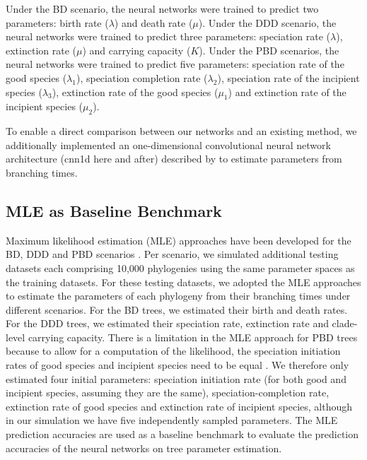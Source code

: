 {Under the BD scenario, the neural networks were trained to predict two parameters: birth rate ($\lambda$) and death rate ($\mu$). Under the DDD scenario, the neural networks were trained to predict three parameters: speciation rate ($\lambda$), extinction rate ($\mu$) and carrying capacity ($K$). Under the PBD scenarios, the neural networks were trained to predict five parameters: speciation rate of the good species ($\lambda_1$), speciation completion rate ($\lambda_2$), speciation rate of the incipient species ($\lambda_3$), extinction rate of the good species ($\mu_1$) and extinction rate of the incipient species ($\mu_2$).

To enable a direct comparison between our networks and an existing method, we additionally implemented an one-dimensional convolutional neural network architecture (\acrshort{cnn1d} here and after) described by \citet{voznica_deep_2022, lajaaiti_comparison_2023} to estimate parameters from branching times.

\subsection{MLE as Baseline Benchmark}
\label{ch2::sec::methods::mle}
Maximum likelihood estimation (MLE) approaches have been developed for the BD, DDD and PBD scenarios \citep{etienne_diversity-dependence_2012,etienne_prolonging_2012,etienne_estimating_2014}. Per scenario, we simulated additional testing datasets each comprising 10,000 phylogenies using the same parameter spaces as the training datasets. For these testing datasets, we adopted the MLE approaches to estimate the parameters of each phylogeny from their branching times under different scenarios. For the BD trees, we estimated their birth and death rates. For the DDD trees, we estimated their speciation rate, extinction rate and clade-level carrying capacity. There is a limitation in the MLE approach for PBD trees because to allow for a computation of the likelihood, the speciation initiation rates of good species and incipient species need to be equal \citep{etienne_estimating_2014}. We therefore only estimated four initial parameters: speciation initiation rate (for both good and incipient species, assuming they are the same), speciation-completion rate, extinction rate of good species and extinction rate of incipient species, although in our simulation we have five independently sampled parameters. The MLE prediction accuracies are used as a baseline benchmark to evaluate the prediction accuracies of the neural networks on tree parameter estimation. 

}
